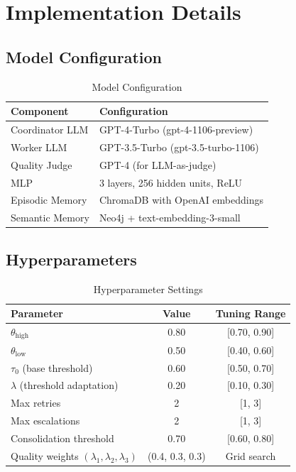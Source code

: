 \documentclass{article}
\theoremstyle{plain}
\theoremstyle{definition}
\theoremstyle{remark}
\begin{document}
\section{Implementation Details}
\label{app:implementation}

\subsection{Model Configuration}

\begin{table}[H]
	\caption{Model Configuration}
	\centering
	\small
	\begin{tabular}{@{}ll@{}}
		\toprule
		\textbf{Component} & \textbf{Configuration} \\
		\midrule
		Coordinator LLM & GPT-4-Turbo (gpt-4-1106-preview) \\
		Worker LLM & GPT-3.5-Turbo (gpt-3.5-turbo-1106) \\
		Quality Judge & GPT-4 (for LLM-as-judge) \\
		\car{} MLP & 3 layers, 256 hidden units, ReLU \\
		Episodic Memory & ChromaDB with OpenAI embeddings \\
		Semantic Memory & Neo4j + text-embedding-3-small \\
		\bottomrule
	\end{tabular}
\end{table}

\subsection{Hyperparameters}

\begin{table}[H]
	\caption{Hyperparameter Settings}
	\centering
	\small
	\begin{tabular}{@{}lcc@{}}
		\toprule
		\textbf{Parameter} & \textbf{Value} & \textbf{Tuning Range} \\
		\midrule
		$\theta_{\text{high}}$ & 0.80 & [0.70, 0.90] \\
		$\theta_{\text{low}}$ & 0.50 & [0.40, 0.60] \\
		$\tau_0$ (base threshold) & 0.60 & [0.50, 0.70] \\
		$\lambda$ (threshold adaptation) & 0.20 & [0.10, 0.30] \\
		Max retries & 2 & [1, 3] \\
		Max escalations & 2 & [1, 3] \\
		Consolidation threshold & 0.70 & [0.60, 0.80] \\
		Quality weights $(\lambda_1, \lambda_2, \lambda_3)$ & (0.4, 0.3, 0.3) & Grid search \\
		\bottomrule
	\end{tabular}
\end{table}
\end{document}
